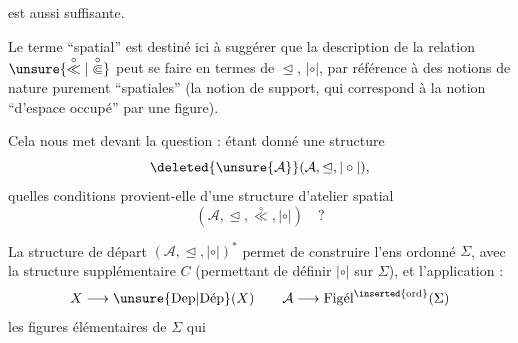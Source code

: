
est aussi suffisante.

Le terme ``spatial''  est destiné ici à suggérer que la description de la relation  $\unsure{\overset{\circ}{\ll}|\overset{\circ}{\Subset}}$ peut se faire en termes de $\trianglelefteq$, $\mathrel{|\circ|}$, par référence à des notions de nature purement ``spatiales'' (la notion de support, qui  correspond à la notion ``d'espace occupé'' par une figure).

Cela nous met devant la question : étant donné une structure
\[
\deleted{\unsure{\mathcal A}}(\mathcal A,\trianglelefteq,\mathrel{|\circ|}),
\]
 quelles conditions provient-elle d'une structure d'atelier spatial
\[
(\mathcal A,\trianglelefteq,\overset{\circ}{\ll},\mathrel{|\circ|})\quad ?
\]

La structure de départ $(\mathcal A,\trianglelefteq,\mathrel{|\circ|})^{*}$ permet de construire l'ens ordonné $\Sigma$, avec la structure supplémentaire $C$ (permettant de définir $\mathrel{|\circ|}$ sur $\Sigma$), et l'application :
\[
X\longrightarrow\unsure{\mathrm{Dep}|\mathrm{D\acute{e}p}}(X)\qquad \mathcal A\longrightarrow\mathrm{Fig\acute{e}l}^{\inserted{\mathrm{ord}}}(\Sigma)
\]
  les figures élémentaires  de $\Sigma$ qui
